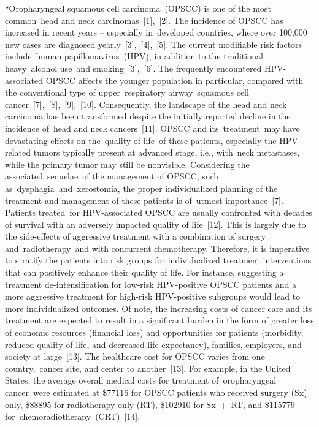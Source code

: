 \documentclass{article}%
\begin{document}
\newline%
%
“Oropharyngeal squamous cell carcinoma~(OPSCC) is one of the most common~head and neck carcinomas~{[}1{]},~{[}2{]}. The incidence of OPSCC has increased in recent years – especially in~developed countries, where over 100,000 new cases are diagnosed yearly~{[}3{]},~{[}4{]},~{[}5{]}. The current modifiable risk factors include~human papillomavirus~(HPV), in addition to the traditional heavy~alcohol use~and smoking~{[}3{]},~{[}6{]}. The frequently encountered HPV{-}associated OPSCC affects the younger population in particular, compared with the conventional type of upper~respiratory airway~squamous cell cancer~{[}7{]},~{[}8{]},~{[}9{]},~{[}10{]}. Consequently, the landscape of the head and neck carcinoma has been transformed despite the initially reported decline in the incidence of~head and neck cancers~{[}11{]}.%
\newline%
\newline%
%
OPSCC and its~treatment~may have devastating effects on the~quality of life~of these patients, especially the HPV{-}related tumors typically present at advanced stage, i.e., with~neck metastases, while the primary tumor may still be nonvisible. Considering the associated~sequelae~of the management of OPSCC, such as~dysphagia~and~xerostomia, the proper individualized planning of the treatment and management of these patients is of~utmost importance~{[}7{]}.%
\newline%
\newline%
%
Patients treated~for HPV{-}associated OPSCC are usually confronted with decades of survival with an adversely impacted quality of life~{[}12{]}. This is largely due to the side{-}effects of aggressive treatment with a combination of surgery and~radiotherapy~and with concurrent chemotherapy. Therefore, it is imperative to stratify the patients into risk groups for individualized treatment interventions that can positively enhance their quality of life. For instance, suggesting a treatment de{-}intensification for low{-}risk HPV{-}positive OPSCC patients and a more aggressive treatment for high{-}risk HPV{-}positive subgroups would lead to more individualized outcomes.%
\newline%
\newline%
%
Of note, the increasing costs of cancer care and its treatment are expected to result in a significant burden in the form of greater loss of economic resources (financial loss) and opportunities for patients (morbidity, reduced quality of life, and decreased life expectancy), families, employers, and society at large~{[}13{]}. The healthcare cost for OPSCC varies from one country,~cancer site, and center to another~{[}13{]}. For example, in the United States, the average overall medical costs for treatment of~oropharyngeal cancer~were estimated at \$77116 for OPSCC patients who received surgery (Sx) only, \$88895 for radiotherapy only (RT), \$102910 for Sx~+~RT, and \$115779 for~chemoradiotherapy~(CRT)~{[}14{]}.%
\end{document}

